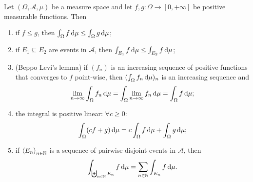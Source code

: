 \begin{proposition} \label{propertiesIntegralPositiveFunctions}
Let $(\Omega, \mathcal{A}, \mu)$ be a measure space and let $f,g:\Omega\to[0,+\infty]$ be positive measurable functions. Then
\begin{enumerate}
\item if $f\leq g$, then $\int_\Omega f\operatorname{d \!}{\mu} \leq \int_\Omega g\operatorname{d \!}{\mu}$;
\item if $E_1\subseteq E_2$ are events in $\mathcal{A}$, then $\int_{E_1}f\operatorname{d \!}{\mu} \leq \int_{E_2}f\operatorname{d \!}{\mu}$;
\item \textup{(Beppo Levi's lemma)} if $(f_n)$  is an increasing sequence of positive functions that converges to $f$ point-wise, then $(\int_\Omega f_n\operatorname{d \!}{\mu})_n$ is an increasing sequence and
\[ \lim_{n\to\infty}\int_\Omega f_n\operatorname{d \!}{\mu} = \int_\Omega \lim_{n\to\infty}f_n\operatorname{d \!}{\mu} = \int_\Omega f\operatorname{d \!}{\mu}; \]
\item the integral is positive linear: $\forall c\geq 0$:
\[ \int_\Omega(cf+g)\operatorname{d \!}{\mu} = c\int_\Omega f\operatorname{d \!}{\mu} + \int_\Omega g\operatorname{d \!}{\mu}; \]
\item if $\left\langle E_n \right\rangle_{n\in \mathbb{N}}$ is a sequence of pairwise disjoint events in $\mathcal{A}$, then
\[ \int_{\biguplus_{n\in \mathbb{N}}E_n}f\operatorname{d \!}{\mu} = \sum_{n\in \mathbb{N}}\int_{E_n}f\operatorname{d \!}{\mu}. \]
\end{enumerate}
\end{proposition}
